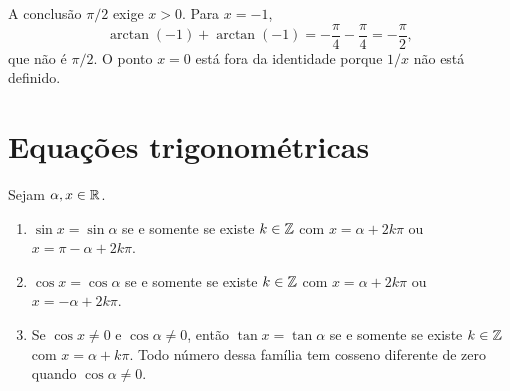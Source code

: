\documentclass[11pt,a4paper]{article}
\begin{document}
\begin{contraexemplo}
A conclusão $\pi/2$ exige $x>0$. Para $x=-1$,
\[
\arctan(-1)+\arctan(-1)=-\frac{\pi}{4}-\frac{\pi}{4}=-\frac{\pi}{2},
\]
que não é $\pi/2$. O ponto $x=0$ está fora da identidade porque $1/x$ não está definido.
\end{contraexemplo}


\section{Equações trigonométricas}

\begin{teorema}\label{teo:eq-gerais}
Sejam $\alpha,x\in\mathbb{R}$.
\begin{enumerate}
\item $\sin x=\sin\alpha$ se e somente se existe $k\in\mathbb{Z}$ com $x=\alpha+2k\pi$ ou $x=\pi-\alpha+2k\pi$.
\item $\cos x=\cos\alpha$ se e somente se existe $k\in\mathbb{Z}$ com $x=\alpha+2k\pi$ ou $x=-\alpha+2k\pi$.
\item Se $\cos x\neq 0$ e $\cos\alpha\neq 0$, então $\tan x=\tan\alpha$ se e somente se existe $k\in\mathbb{Z}$ com $x=\alpha+k\pi$. Todo número dessa família tem cosseno diferente de zero quando $\cos\alpha\neq 0$.
\end{enumerate}
\end{teorema}
\end{document}
